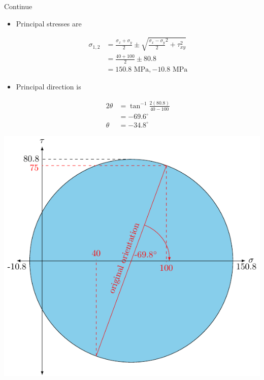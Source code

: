 \documentclass[10pt, svgnames]{beamer}
\begin{document}
\begin{frame}[label={sec:orgb7d65fc}]{Continue}
\begin{itemize}
\item Principal stresses are

\begin{align*}
  \sigma_{1,2} &= \frac{\sigma_x + \sigma _y}{2} \pm \sqrt {\frac{\sigma _x - \sigma_y}{2}^2 + \tau _{xy}^2}  \\
               &= \frac{40 + 100}{2} \pm 80.8 \\
               &= 150.8 \text{ MPa}, - 10.8 \text{ MPa}
\end{align*}

\item Principal direction is

\begin{align*}
  2\theta  &= \tan^{-1}\frac{2(80.8)}{40 - 100} \\
           &= -69.6^{\circ} \\
  \theta &= -34.8^{\circ}
\end{align*}
\end{itemize}
\end{frame}

\begin{frame}[label={sec:org55281ee}]{}
\begin{center}
\includegraphics[width=.9\linewidth]{pictures/example-II-mohrs.pdf}
\end{center}
\end{frame}
\end{document}
